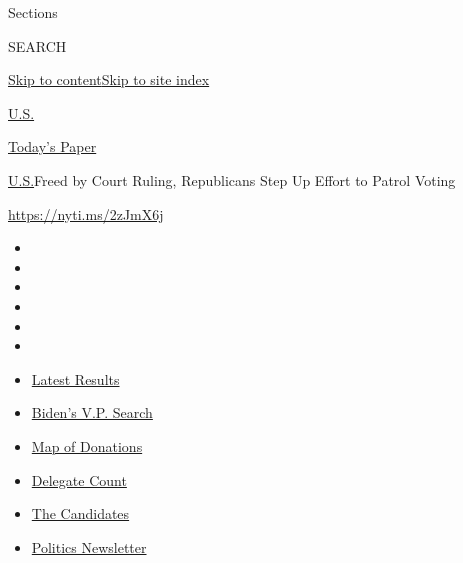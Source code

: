 Sections

SEARCH

\protect\hyperlink{site-content}{Skip to
content}\protect\hyperlink{site-index}{Skip to site index}

\href{https://www.nytimes3xbfgragh.onion/section/us}{U.S.}

\href{https://myaccount.nytimes3xbfgragh.onion/auth/login?response_type=cookie\&client_id=vi}{}

\href{https://www.nytimes3xbfgragh.onion/section/todayspaper}{Today's
Paper}

\href{/section/us}{U.S.}\textbar{}Freed by Court Ruling, Republicans
Step Up Effort to Patrol Voting

\url{https://nyti.ms/2zJmX6j}

\begin{itemize}
\item
\item
\item
\item
\item
\item
\end{itemize}

\begin{itemize}
\item
  \href{https://www.nytimes3xbfgragh.onion/interactive/2020/08/04/us/elections/results-arizona-kansas-michigan-missouri-primaries.html?action=click\&pgtype=Article\&state=default\&region=TOP_BANNER\&context=storylines_menu}{Latest
  Results}
\item
  \href{https://www.nytimes3xbfgragh.onion/article/biden-vice-president-2020.html?action=click\&pgtype=Article\&state=default\&region=TOP_BANNER\&context=storylines_menu}{Biden's
  V.P. Search}
\item
  \href{https://www.nytimes3xbfgragh.onion/interactive/2020/07/24/us/politics/trump-biden-campaign-donors.html?action=click\&pgtype=Article\&state=default\&region=TOP_BANNER\&context=storylines_menu}{Map
  of Donations}
\item
  \href{https://www.nytimes3xbfgragh.onion/interactive/2020/us/elections/delegate-count-primary-results.html?action=click\&pgtype=Article\&state=default\&region=TOP_BANNER\&context=storylines_menu}{Delegate
  Count}
\item
  \href{https://www.nytimes3xbfgragh.onion/interactive/2019/us/politics/2020-presidential-candidates.html?action=click\&pgtype=Article\&state=default\&region=TOP_BANNER\&context=storylines_menu}{The
  Candidates}
\item
  \href{https://www.nytimes3xbfgragh.onion/newsletters/politics?action=click\&pgtype=Article\&state=default\&region=TOP_BANNER\&context=storylines_menu}{Politics
  Newsletter}
\end{itemize}

